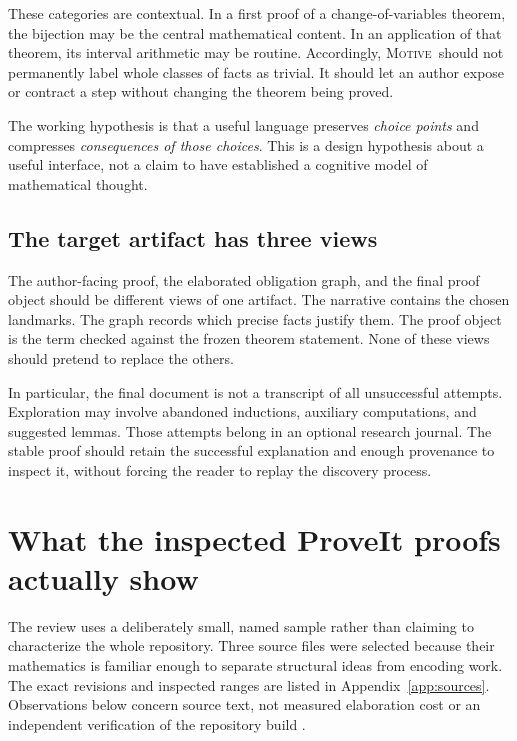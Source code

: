 \documentclass[11pt,a4paper]{article}
\newcommand{\Motive}{\textnormal{\textsc{Motive}}}
\theoremstyle{remark}
\begin{document}
These categories are contextual. In a first proof of a change-of-variables theorem, the bijection may be the central mathematical content. In an application of that theorem, its interval arithmetic may be routine. Accordingly, \Motive\ should not permanently label whole classes of facts as trivial. It should let an author expose or contract a step without changing the theorem being proved.

The working hypothesis is that a useful language preserves \emph{choice points} and compresses \emph{consequences of those choices}. This is a design hypothesis about a useful interface, not a claim to have established a cognitive model of mathematical thought.

\subsection{The target artifact has three views}
The author-facing proof, the elaborated obligation graph, and the final proof object should be different views of one artifact. The narrative contains the chosen landmarks. The graph records which precise facts justify them. The proof object is the term checked against the frozen theorem statement. None of these views should pretend to replace the others.

In particular, the final document is not a transcript of all unsuccessful attempts. Exploration may involve abandoned inductions, auxiliary computations, and suggested lemmas. Those attempts belong in an optional research journal. The stable proof should retain the successful explanation and enough provenance to inspect it, without forcing the reader to replay the discovery process.

\section{What the inspected ProveIt proofs actually show}
\label{sec:observations}
The review uses a deliberately small, named sample rather than claiming to characterize the whole repository. Three source files were selected because their mathematics is familiar enough to separate structural ideas from encoding work. The exact revisions and inspected ranges are listed in Appendix~\ref{app:sources}. Observations below concern source text, not measured elaboration cost or an independent verification of the repository build \cite{proveit}.
\end{document}
